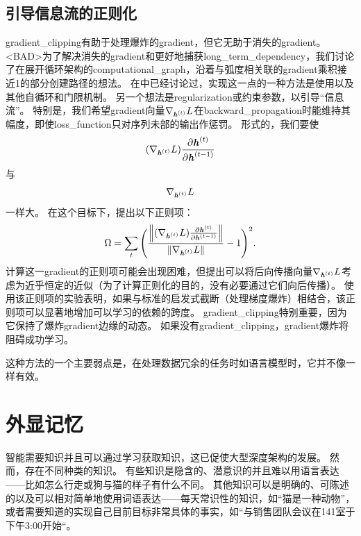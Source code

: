 \subsection{引导信息流的正则化}
\label{sec:regularizing_to_encourage_information_flow}
\gls{gradient_clipping}有助于处理爆炸的\gls{gradient}，但它无助于消失的\gls{gradient}。
<BAD>为了解决消失的\gls{gradient}和更好地捕获\gls{long_term_dependency}，我们讨论了在展开循环架构的\gls{computational_graph}，沿着与弧度相关联的\gls{gradient}乘积接近1的部分创建路径的想法。
在中已经讨论过，实现这一点的一种方法是使用以及其他自循环和门限机制。
另一个想法是\gls{regularization}或约束参数，以引导``信息流''。
特别是，我们希望\gls{gradient}向量$\nabla_{\boldsymbol{\mathit{h}}^{(t)}} L$在\gls{backward_propagation}时能维持其幅度，即使\gls{loss_function}只对序列未部的输出作惩罚。
形式的，我们要使
\begin{align}
 (\nabla_{\boldsymbol{\mathit{h}}^{(t)}} L) \frac{\partial \boldsymbol{\mathit{h}}^{(t)}}{\partial \boldsymbol{\mathit{h}}^{(t-1)}}
\end{align}
与
\begin{align}
\nabla_{\boldsymbol{\mathit{h}}^{(t)}} L 
\end{align}
一样大。
在这个目标下，\citep{Pascanu+al-ICML2013-small}提出以下正则项：
\begin{align}
 \Omega = \sum_t \Bigg(  \frac{
 \left\lVert (\nabla_{\boldsymbol{\mathit{h}}^{(t)}} L) \frac{\partial \boldsymbol{\mathit{h}}^{(t)}}{\partial \boldsymbol{\mathit{h}}^{(t-1)}}\right\rVert}
 {\left\lVert\nabla_{\boldsymbol{\mathit{h}}^{(t)}} L\right\rVert} -1 \Bigg)^2.
\end{align}
计算这一\gls{gradient}的正则项可能会出现困难，但\citep{Pascanu+al-ICML2013-small}提出可以将后向传播向量$\nabla_{\boldsymbol{\mathit{h}}^{(t)}} L$考虑为近乎恒定的近似（为了计算正则化的目的，没有必要通过它们向后传播）。
使用该正则项的实验表明，如果与标准的启发式截断（处理梯度爆炸）相结合，该正则项可以显著地增加可以学习的依赖的跨度。
\gls{gradient_clipping}特别重要，因为它保持了爆炸\gls{gradient}边缘的动态。
如果没有\gls{gradient_clipping}，\gls{gradient}爆炸将阻碍成功学习。

这种方法的一个主要弱点是，在处理数据冗余的任务时如语言模型时，它并不像一样有效。


\section{外显记忆}
\label{sec:explicit_memory}
智能需要知识并且可以通过学习获取知识，这已促使大型深度架构的发展。
然而，存在不同种类的知识。
有些知识是隐含的、潜意识的并且难以用语言表达——比如怎么行走或狗与猫的样子有什么不同。
其他知识可以是明确的、可陈述的以及可以相对简单地使用词语表达——每天常识性的知识，如``猫是一种动物''，或者需要知道的实现自己目前目标非常具体的事实，如``与销售团队会议在141室于下午3:00开始``。


